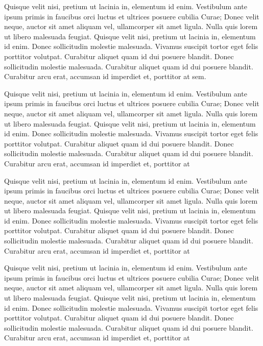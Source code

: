 \documentclass{scrbook}
\begin{document}
Quisque velit nisi, pretium ut lacinia in, elementum id enim. Vestibulum
ante ipsum primis in faucibus orci luctus et ultrices posuere cubilia
Curae; Donec velit neque, auctor sit amet aliquam vel, ullamcorper sit
amet ligula. Nulla quis lorem ut libero malesuada feugiat. Quisque velit
nisi, pretium ut lacinia in, elementum id enim. Donec sollicitudin
molestie malesuada. Vivamus suscipit tortor eget felis porttitor
volutpat. Curabitur aliquet quam id dui posuere blandit. Donec
sollicitudin molestie malesuada. Curabitur aliquet quam id dui posuere
blandit. Curabitur arcu erat, accumsan id imperdiet et, porttitor at
sem.

Quisque velit nisi, pretium ut lacinia in, elementum id enim. Vestibulum
ante ipsum primis in faucibus orci luctus et ultrices posuere cubilia
Curae; Donec velit neque, auctor sit amet aliquam vel, ullamcorper sit
amet ligula. Nulla quis lorem ut libero malesuada feugiat. Quisque velit
nisi, pretium ut lacinia in, elementum id enim. Donec sollicitudin
molestie malesuada. Vivamus suscipit tortor eget felis porttitor
volutpat. Curabitur aliquet quam id dui posuere blandit. Donec
sollicitudin molestie malesuada. Curabitur aliquet quam id dui posuere
blandit. Curabitur arcu erat, accumsan id imperdiet et, porttitor at

Quisque velit nisi, pretium ut lacinia in, elementum id enim. Vestibulum
ante ipsum primis in faucibus orci luctus et ultrices posuere cubilia
Curae; Donec velit neque, auctor sit amet aliquam vel, ullamcorper sit
amet ligula. Nulla quis lorem ut libero malesuada feugiat. Quisque velit
nisi, pretium ut lacinia in, elementum id enim. Donec sollicitudin
molestie malesuada. Vivamus suscipit tortor eget felis porttitor
volutpat. Curabitur aliquet quam id dui posuere blandit. Donec
sollicitudin molestie malesuada. Curabitur aliquet quam id dui posuere
blandit. Curabitur arcu erat, accumsan id imperdiet et, porttitor at

Quisque velit nisi, pretium ut lacinia in, elementum id enim. Vestibulum
ante ipsum primis in faucibus orci luctus et ultrices posuere cubilia
Curae; Donec velit neque, auctor sit amet aliquam vel, ullamcorper sit
amet ligula. Nulla quis lorem ut libero malesuada feugiat. Quisque velit
nisi, pretium ut lacinia in, elementum id enim. Donec sollicitudin
molestie malesuada. Vivamus suscipit tortor eget felis porttitor
volutpat. Curabitur aliquet quam id dui posuere blandit. Donec
sollicitudin molestie malesuada. Curabitur aliquet quam id dui posuere
blandit. Curabitur arcu erat, accumsan id imperdiet et, porttitor at
\end{document}
